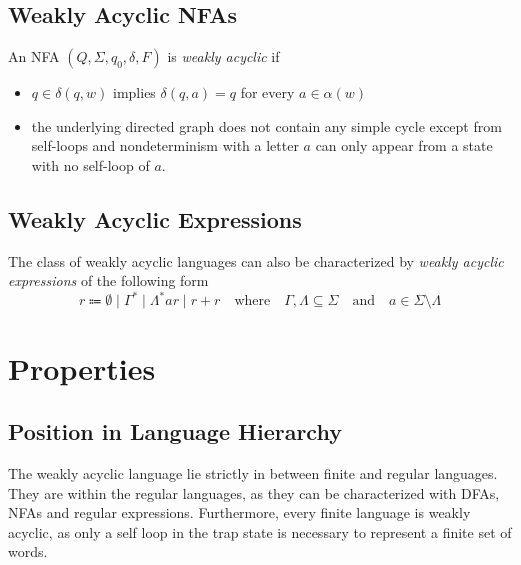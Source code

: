 
\subsection{Weakly Acyclic NFAs}
An NFA $(Q, \Sigma, q_{0},\delta,F)$ is \textit{weakly acyclic} if 
\begin{itemize}[--,noitemsep]
	\item $q \in \delta(q,w)$ implies $\delta(q,a) = {q}$ for every $a \in \alpha(w)$
	\item the underlying directed graph does not contain any simple cycle except from self-loops and nondeterminism with a letter $a$ can only appear from a state with no self-loop of $a$.
\end{itemize}

\subsection{Weakly Acyclic Expressions}\label{sec:weakly_acyclic_regex}
The class of weakly acyclic languages can also be characterized by \textit{weakly acyclic expressions} of the following form
\begin{equation*}
r \Coloneqq \emptyset \mid \Gamma^{*} \mid \Lambda^{*} ar \mid r + r \quad \text{where} \quad  \Gamma, \Lambda \subseteq \Sigma \quad \textrm{and} \quad a \in \Sigma \setminus \Lambda
\end{equation*}


\section{Properties}
\subsection{Position in Language Hierarchy}
The weakly acyclic language lie strictly in between finite and regular languages. 
They are within the regular languages, as they can be characterized with DFAs, NFAs and regular expressions. Furthermore, every finite language is weakly acyclic, as only a self loop in the trap state is necessary to represent a finite set of words.


